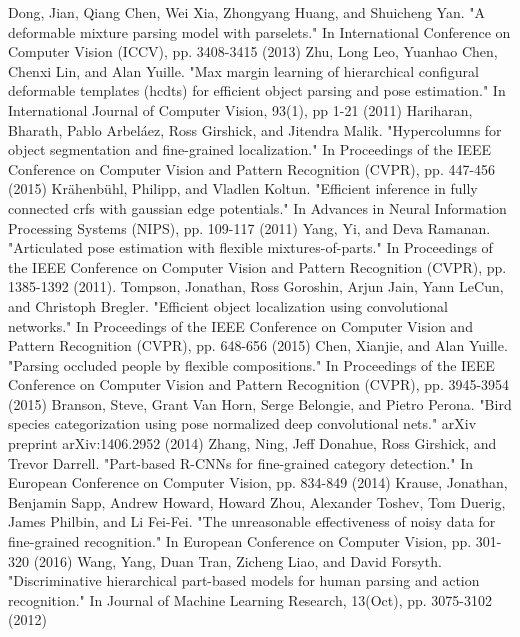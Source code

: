 \begin{thebibliography}{}
Dong, Jian, Qiang Chen, Wei Xia, Zhongyang Huang, and Shuicheng Yan. "A deformable mixture parsing model with parselets." In International Conference on Computer Vision (ICCV), pp. 3408-3415 (2013)
Zhu, Long Leo, Yuanhao Chen, Chenxi Lin, and Alan Yuille. "Max margin learning of hierarchical configural deformable templates (hcdts) for efficient object parsing and pose estimation." In International Journal of Computer Vision, 93(1), pp 1-21 (2011)
Hariharan, Bharath, Pablo Arbeláez, Ross Girshick, and Jitendra Malik. "Hypercolumns for object segmentation and fine-grained localization." In Proceedings of the IEEE Conference on Computer Vision and Pattern Recognition (CVPR), pp. 447-456 (2015)
Krähenbühl, Philipp, and Vladlen Koltun. "Efficient inference in fully connected crfs with gaussian edge potentials." In Advances in Neural Information Processing Systems (NIPS), pp. 109-117 (2011)
%
Yang, Yi, and Deva Ramanan. "Articulated pose estimation with flexible mixtures-of-parts." In Proceedings of the IEEE Conference on Computer Vision and Pattern Recognition (CVPR), pp. 1385-1392 (2011).
Tompson, Jonathan, Ross Goroshin, Arjun Jain, Yann LeCun, and Christoph Bregler. "Efficient object localization using convolutional networks." In Proceedings of the IEEE Conference on Computer Vision and Pattern Recognition (CVPR), pp. 648-656 (2015)
Chen, Xianjie, and Alan Yuille. "Parsing occluded people by flexible compositions." In Proceedings of the IEEE Conference on Computer Vision and Pattern Recognition (CVPR), pp. 3945-3954 (2015)
%
Branson, Steve, Grant Van Horn, Serge Belongie, and Pietro Perona. "Bird species categorization using pose normalized deep convolutional nets." arXiv preprint arXiv:1406.2952 (2014)
Zhang, Ning, Jeff Donahue, Ross Girshick, and Trevor Darrell. "Part-based R-CNNs for fine-grained category detection." In European Conference on Computer Vision, pp. 834-849 (2014)
Krause, Jonathan, Benjamin Sapp, Andrew Howard, Howard Zhou, Alexander Toshev, Tom Duerig, James Philbin, and Li Fei-Fei. "The unreasonable effectiveness of noisy data for fine-grained recognition." In European Conference on Computer Vision, pp. 301-320 (2016)
%
Wang, Yang, Duan Tran, Zicheng Liao, and David Forsyth. "Discriminative hierarchical part-based models for human parsing and action recognition." In Journal of Machine Learning Research, 13(Oct), pp. 3075-3102 (2012)

\end{thebibliography}
